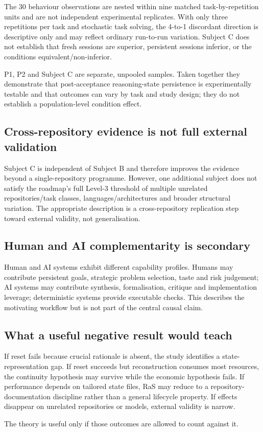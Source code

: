 The 30 behaviour observations are nested within nine matched task-by-repetition units and are not independent experimental replicates. With only three repetitions per task and stochastic task solving, the 4-to-1 discordant direction is descriptive only and may reflect ordinary run-to-run variation. Subject C does not establish that fresh sessions are superior, persistent sessions inferior, or the conditions equivalent/non-inferior.

P1, P2 and Subject C are separate, unpooled samples. Taken together they demonstrate that post-acceptance reasoning-state persistence is experimentally testable and that outcomes can vary by task and study design; they do not establish a population-level condition effect.

\subsection{Cross-repository evidence is not full external validation}

Subject C is independent of Subject B and therefore improves the evidence beyond a single-repository programme. However, one additional subject does not satisfy the roadmap's full Level-3 threshold of multiple unrelated repositories/task classes, languages/architectures and broader structural variation. The appropriate description is a cross-repository replication step toward external validity, not generalisation.

\subsection{Human and AI complementarity is secondary}

Human and AI systems exhibit different capability profiles. Humans may contribute persistent goals, strategic problem selection, taste and risk judgement; AI systems may contribute synthesis, formalisation, critique and implementation leverage; deterministic systems provide executable checks. This describes the motivating workflow but is not part of the central causal claim.

\subsection{What a useful negative result would teach}

If reset fails because crucial rationale is absent, the study identifies a state-representation gap. If reset succeeds but reconstruction consumes most resources, the continuity hypothesis may survive while the economic hypothesis fails. If performance depends on tailored state files, RaS may reduce to a repository-documentation discipline rather than a general lifecycle property. If effects disappear on unrelated repositories or models, external validity is narrow.

The theory is useful only if those outcomes are allowed to count against it.
